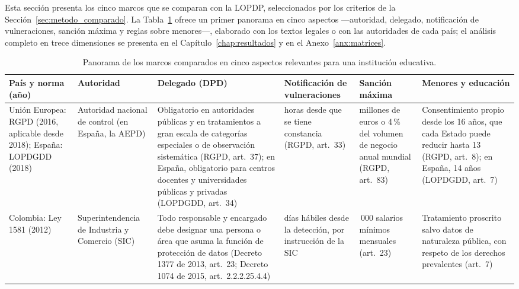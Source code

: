 Esta sección presenta los cinco marcos que se comparan con la LOPDP, seleccionados por los criterios de la Sección~\ref{sec:metodo_comparado}. La Tabla~\ref{tab:comparativa_paises} ofrece un primer panorama en cinco aspectos ---autoridad, delegado, notificación de vulneraciones, sanción máxima y reglas sobre menores---, elaborado con los textos legales o con las autoridades de cada país; el análisis completo en trece dimensiones se presenta en el Capítulo~\ref{chap:resultados} y en el Anexo~\ref{anx:matrices}.

\begin{landscape}
\begin{table}[p]
  \centering
  \caption{Panorama de los marcos comparados en cinco aspectos relevantes para una institución educativa.}
  \label{tab:comparativa_paises}
  \scriptsize
  \renewcommand{\arraystretch}{1.1}
  \begin{tabularx}{\linewidth}{|>{\raggedright\arraybackslash}p{3.0cm}|>{\raggedright\arraybackslash}p{2.6cm}|>{\raggedright\arraybackslash}X|>{\raggedright\arraybackslash}p{3.2cm}|>{\raggedright\arraybackslash}p{3.2cm}|>{\raggedright\arraybackslash}X|}
    \hline
    \textbf{País y norma (año)} & \textbf{Autoridad} & \textbf{Delegado (DPD)} & \textbf{Notificación de vulneraciones} & \textbf{Sanción máxima} & \textbf{Menores y educación} \\
    \hline
    Unión Europea: RGPD (2016, aplicable desde 2018); España: LOPDGDD (2018) \cite{rgpd2016,lopdgdd2018} & Autoridad nacional de control (en España, la AEPD) & Obligatorio en autoridades públicas y en tratamientos a gran escala de categorías especiales o de observación sistemática (RGPD, art.~37); en España, obligatorio para centros docentes y universidades públicas y privadas (LOPDGDD, art.~34) & 72 horas desde que se tiene constancia (RGPD, art.~33) & 20 millones de euros o 4\,\% del volumen de negocio anual mundial (RGPD, art.~83) & Consentimiento propio desde los 16 años, que cada Estado puede reducir hasta 13 (RGPD, art.~8); en España, 14 años (LOPDGDD, art.~7) \\
    \hline
    Colombia: Ley 1581 (2012) \cite{colombia2012ley1581,colombia2013decreto1377,sic2020incidentes} & Superintendencia de Industria y Comercio (SIC) & Todo responsable y encargado debe designar una persona o área que asuma la función de protección de datos (Decreto 1377 de 2013, art.~23; Decreto 1074 de 2015, art.~2.2.2.25.4.4) & 15 días hábiles desde la detección, por instrucción de la SIC & 2\,000 salarios mínimos mensuales (art.~23) & Tratamiento proscrito salvo datos de naturaleza pública, con respeto de los derechos prevalentes (art.~7) \\

\end{tabularx}
\end{table}
\end{landscape}
